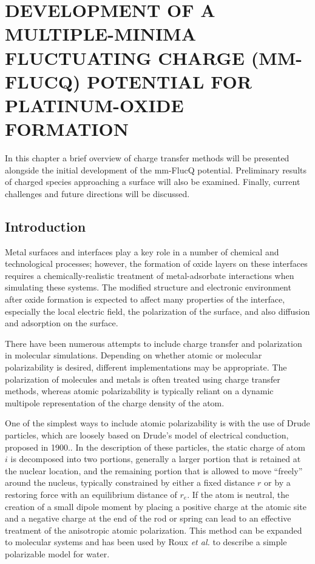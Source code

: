 
\chapter{DEVELOPMENT OF A MULTIPLE-MINIMA FLUCTUATING CHARGE (MM-FLUCQ) POTENTIAL FOR PLATINUM-OXIDE FORMATION}
\label{chap:mmFlucQ}


In this chapter a brief overview of charge transfer methods will be presented
alongside the initial development of the mm-FlucQ potential.  Preliminary
results of charged species approaching a  surface will also be
examined. Finally, current challenges and future directions will be discussed.


\section{Introduction}
Metal surfaces and interfaces play a key role in a number of chemical and
technological processes; however, the formation of oxide layers on these
interfaces requires a chemically-realistic treatment of metal-adsorbate
interactions when simulating these systems\citep{Streitz:1994mw, Duin:2010dk,
Devine:2011bk, Fantauzzi:2014pb}.  The modified structure and
electronic environment after oxide formation is expected to
affect many properties of the interface, especially the local electric field,
the polarization of the surface, and also diffusion and adsorption on the
surface.\citep{Streitz:1994mw, Getman:2008sp, Bray:2011hq,Small:2012dw}

There have been numerous attempts to include charge transfer and polarization
in molecular simulations.\citep{Rick:1994ss, Streitz:1994mw,
Siepmann:1995es, Iori:2008ic, Iori:2009au} Depending on whether atomic or
molecular polarizability is desired, different implementations may be
appropriate. The polarization of molecules and metals is often treated using
charge transfer methods, whereas atomic polarizability is typically
reliant on a dynamic multipole representation of the charge density of the
atom.

One of the simplest ways to include atomic polarizability is with the use of
Drude particles, which are loosely based on Drude's model of electrical
conduction, proposed in 1900.\citep{Drude:1900aa, Drude:1900bb}. In the
description of these particles, the static charge of atom $i$ is decomposed
into two portions, generally a larger portion that is retained at the nuclear
location, and the remaining portion that is allowed to move ``freely'' around
the nucleus, typically constrained by either a fixed distance $r$ or by a
restoring force with an equilibrium distance of $r_e$. If the atom is
neutral, the creation of a small dipole moment by placing a positive charge at
the atomic site and a negative charge at the end of the rod or spring can lead
to an effective treatment of the anisotropic atomic polarization. This method
can be expanded to molecular systems and has been used by Roux {\em et al.} to
describe a simple polarizable model for water.\citep{Roux:2003ho}

